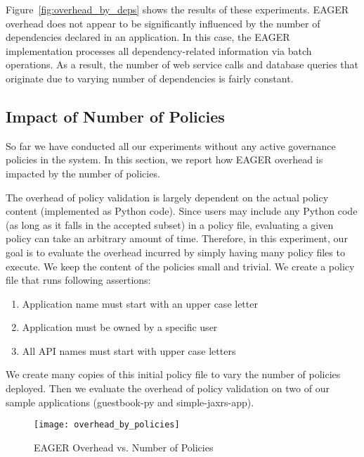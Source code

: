Figure~\ref{fig:overhead_by_deps} shows the results of these experiments. 
EAGER overhead does not appear to be significantly
influenced by the number of dependencies declared in an application. 
In this case, the EAGER implementation processes
all dependency-related information via batch operations. 
As a result, the number of web service calls and database queries that originate 
due to varying number of dependencies is fairly constant. 

\subsection{Impact of Number of Policies}

So far we have conducted all our experiments without any active governance 
policies in the system. In this section, we report how EAGER overhead
is impacted by the number of policies.

The overhead of policy validation is largely dependent on the actual policy
content (implemented as Python code). Since users may include any Python code 
(as long as it falls in the accepted subset) in a policy file, evaluating a
given policy can take an arbitrary amount of time.  Therefore, in this
experiment, our goal is to evaluate the overhead incurred by simply having
many policy files to execute. We keep the content of the policies small and
trivial. We create a policy file that runs following assertions:
\begin{enumerate} 
\vspace{0.05in}
\item Application name must start with an upper case letter
\vspace{0.05in}
\item Application must be owned by a specific user 
\vspace{0.05in}
\item All API names must start with upper case letters 
\vspace{0.05in}
\end{enumerate} We create many copies of this
initial policy file to vary the number of policies deployed. Then we evaluate
the overhead of policy validation on two of our sample applications
(guestbook-py and simple-jaxrs-app). 

\begin{figure}
\centering
\texttt{[image: overhead\_by\_policies]}
\caption{EAGER Overhead vs. Number of Policies}
\label{fig:overhead_by_policies}
\end{figure}

